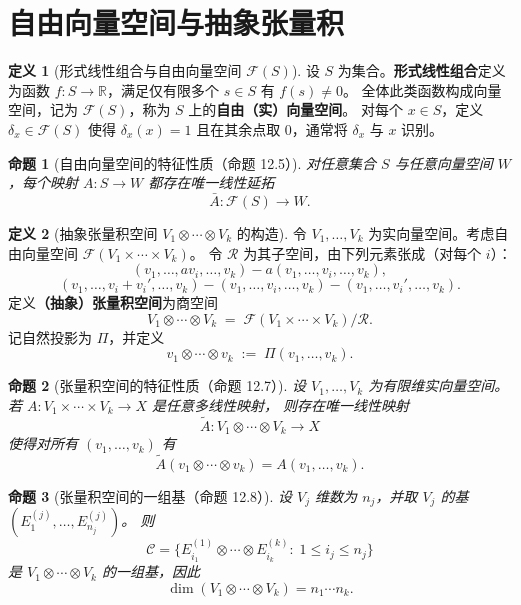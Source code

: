 \documentclass[11pt]{article}
\theoremstyle{definition}
\newtheorem{definition}{定义}[section]
\theoremstyle{plain}
\newtheorem{proposition}{命题}[section]
\newcommand{\R}{\mathbb{R}}
\newcommand{\F}{\mathcal{F}}
\newcommand{\ot}{\otimes}
\begin{document}
\section{自由向量空间与抽象张量积}

\begin{definition}[形式线性组合与自由向量空间 $\F(S)$]
设 $S$ 为集合。\textbf{形式线性组合}定义为函数 $f:S\to\R$，满足仅有限多个 $s\in S$ 有 $f(s)\ne 0$。
全体此类函数构成向量空间，记为 $\F(S)$，称为 $S$ 上的\textbf{自由（实）向量空间}。
对每个 $x\in S$，定义 $\delta_x\in \F(S)$ 使得 $\delta_x(x)=1$ 且在其余点取 $0$，通常将 $\delta_x$ 与 $x$ 识别。
\end{definition}

\begin{proposition}[自由向量空间的特征性质（命题 12.5）]
对任意集合 $S$ 与任意向量空间 $W$，每个映射 $A:S\to W$ 都存在唯一线性延拓
\[
\bar A:\F(S)\to W.
\]
\end{proposition}

\begin{definition}[抽象张量积空间 $V_1\ot\cdots\ot V_k$ 的构造]
令 $V_1,\dots,V_k$ 为实向量空间。考虑自由向量空间 $\F(V_1\times\cdots\times V_k)$。
令 $\mathcal{R}$ 为其子空间，由下列元素张成（对每个 $i$）：
\[
(v_1,\dots,av_i,\dots,v_k)-a(v_1,\dots,v_i,\dots,v_k),
\]
\[
(v_1,\dots,v_i+v_i',\dots,v_k)-(v_1,\dots,v_i,\dots,v_k)-(v_1,\dots,v_i',\dots,v_k).
\]
定义\textbf{（抽象）张量积空间}为商空间
\[
V_1\ot\cdots\ot V_k \;=\; \F(V_1\times\cdots\times V_k)/\mathcal{R}.
\]
记自然投影为 $\Pi$，并定义
\[
v_1\ot\cdots\ot v_k \;:=\;\Pi(v_1,\dots,v_k).
\]
\end{definition}

\begin{proposition}[张量积空间的特征性质（命题 12.7）]
设 $V_1,\dots,V_k$ 为有限维实向量空间。若 $A:V_1\times\cdots\times V_k\to X$ 是任意多线性映射，
则存在唯一线性映射
\[
\widetilde{A}:V_1\ot\cdots\ot V_k\to X
\]
使得对所有 $(v_1,\dots,v_k)$ 有
\[
\widetilde{A}(v_1\ot\cdots\ot v_k)=A(v_1,\dots,v_k).
\]
\end{proposition}

\begin{proposition}[张量积空间的一组基（命题 12.8）]
设 $V_j$ 维数为 $n_j$，并取 $V_j$ 的基 $(E^{(j)}_1,\dots,E^{(j)}_{n_j})$。
则
\[
\mathcal{C}=\bigl\{E^{(1)}_{i_1}\ot\cdots\ot E^{(k)}_{i_k}:\;1\le i_j\le n_j\bigr\}
\]
是 $V_1\ot\cdots\ot V_k$ 的一组基，因此
\[
\dim(V_1\ot\cdots\ot V_k)=n_1\cdots n_k.
\]
\end{proposition}
\end{document}
